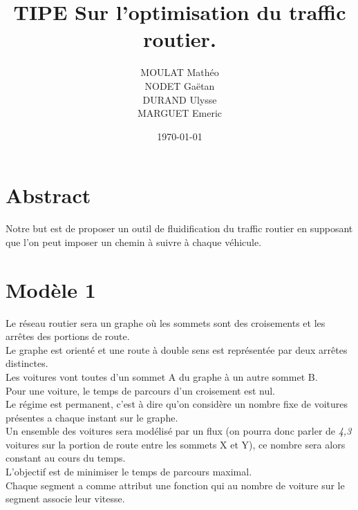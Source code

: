 \documentclass{article}
\title{TIPE Sur l'optimisation du traffic routier.}
\author{MOULAT Mathéo\\NODET Gaëtan\\DURAND Ulysse\\MARGUET Emeric}
\date{\today}
\begin{document}
\maketitle

\section{Abstract}
Notre but est de proposer un outil de fluidification du traffic routier en supposant que l'on peut imposer un chemin à suivre à chaque véhicule. 


\section{Modèle 1} 

Le réseau routier sera un graphe où les sommets sont des croisements et les arrêtes des portions de route.\\
Le graphe est orienté et une route à double sens est représentée par deux arrêtes distinctes.\\
Les voitures vont toutes d'un sommet A du graphe à un autre sommet B.\\
Pour une voiture, le temps de parcours d'un croisement  est nul.
\\
Le régime est permanent, c'est à dire qu'on considère un nombre fixe de voitures présentes a chaque instant sur le graphe.\\
Un ensemble des voitures sera modélisé par un flux (on pourra donc parler de \textit{4,3} voitures sur la portion de route entre les sommets X et Y), ce nombre sera alors constant au cours du temps.\\
L'objectif est de minimiser le temps de parcours maximal.\\
Chaque segment a comme attribut une fonction qui au nombre de voiture sur le segment associe leur vitesse.
\newpage
\end{document}
